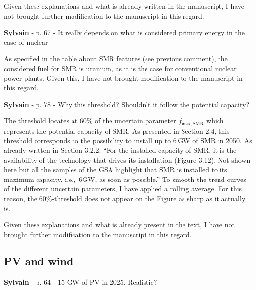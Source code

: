 \documentclass[12pt,a4paper]{article}
\def\ie{i.e.,\ }
\begin{document}
Given these explanations and what is already written in the manuscript, I have not brought further modification to the manuscript in this regard.

\begin{mdframed}[style=comment] %
{\color{purple} \textbf{Sylvain}} - p. 67 - It really depends on what is considered primary energy in the case of nuclear
\end{mdframed}

\noindent As specified in the table about SMR features (see previous comment), the considered fuel for SMR is uranium, as it is the case for conventional nuclear power plants. Given this, I have not brought modification to the manuscript in this regard.

\begin{mdframed}[style=comment] %
{\color{purple} \textbf{Sylvain}} - p. 78 - Why this threshold? Shouldn't it follow the potential capacity?
\end{mdframed}

\noindent The threshold locates at 60\% of the uncertain parameter $f_{\mathrm{max,SMR}}$ which represents the potential capacity of SMR. As presented in Section 2.4, this threshold corresponds to the possibility to install up to 6\,GW of SMR in 2050. As already written in Section 3.2.2: ``For the installed capacity of SMR, it is the availability of the technology that drives its installation (Figure 3.12). Not shown here but all the samples of the GSA highlight that SMR is installed to its maximum capacity, \ie 6GW, as soon as possible.'' To smooth the trend curves of the different uncertain parameters, I have applied a rolling average.  For this reason, the 60\%-threshold does not appear on the Figure as sharp as it actually is.

Given these explanations and what is already present in the text, I have not brought further modification to the manuscript in this regard.

\subsection{PV and wind}

\begin{mdframed}[style=comment] %
{\color{purple} \textbf{Sylvain}} - p. 64 - 15 GW of PV in 2025. Realistic?
\end{mdframed}
\end{document}
